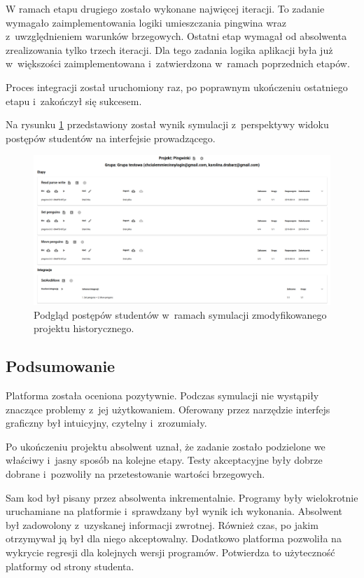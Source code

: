 W ramach etapu drugiego zostało wykonane najwięcej iteracji.
To zadanie wymagało zaimplementowania logiki umieszczania pingwina wraz z~uwzględnieniem warunków brzegowych.
Ostatni etap wymagał od absolwenta zrealizowania tylko trzech iteracji.
Dla tego zadania logika aplikacji była już w~większości zaimplementowana i~zatwierdzona w~ramach poprzednich etapów.

Proces integracji został uruchomiony raz, po poprawnym ukończeniu ostatniego etapu i~zakończył się sukcesem.

Na rysunku \ref{fig:penguins_simulation_interface} przedstawiony został wynik symulacji z~perspektywy widoku postępów studentów na interfejsie prowadzącego.

\vfill

\begin{figure}[H]
    \centering
    \includegraphics[width = 16cm]{chapter07/penguins_preview.png}
    \caption{Podgląd postępów studentów w~ramach symulacji zmodyfikowanego projektu historycznego.}
    \label{fig:penguins_simulation_interface}
\end{figure}

\subsection{Podsumowanie}

Platforma została oceniona pozytywnie.
Podczas symulacji nie wystąpiły znaczące problemy z~jej użytkowaniem.
Oferowany przez narzędzie interfejs graficzny był intuicyjny, czytelny i~zrozumiały.

Po ukończeniu projektu absolwent uznał, że zadanie zostało podzielone we właściwy i~jasny sposób na kolejne etapy.
Testy akceptacyjne były dobrze dobrane i~pozwoliły na przetestowanie wartości brzegowych.

Sam kod był pisany przez absolwenta inkrementalnie.
Programy były wielokrotnie uruchamiane na platformie i~sprawdzany był wynik ich wykonania.
Absolwent był zadowolony z~uzyskanej informacji zwrotnej.
Również czas, po jakim otrzymywał ją był dla niego akceptowalny.
Dodatkowo platforma pozwoliła na wykrycie regresji dla kolejnych wersji programów.
Potwierdza to użyteczność platformy od strony studenta.

